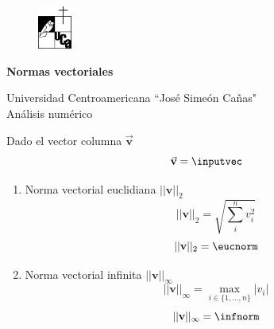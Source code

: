 \documentclass{article}
\newenvironment{fmpage}[1]
{\begin{lrbox}{\fmbox}\begin{minipage}{#1}}
{\end{minipage}\end{lrbox}\fbox{\usebox{\fmbox}}}
\begin{document}
\begin{center}
\begin{minipage}{\linewidth}
\vspace{-0.5cm}
\begin{fmpage}{\linewidth}
\vspace{0.5cm}
\begin{figure}
\vspace{-1.0cm}

\centering
\includegraphics[width=0.1\textwidth]{logo}
\end{figure}
\LARGE{\textbf {Normas vectoriales}}

\vspace{0.5cm}
\large{Universidad Centroamericana ``Jos\'e Sime\'on Ca\~nas"} \\
\large{An\'alisis num\'erico}
\vspace{0.5cm}
\end{fmpage}
\vspace{1cm}
\end{minipage}
\end{center}


\large{Dado el vector columna $\vec{\mathbf{v}}$}
\[
\vec{\mathbf{v}}=
\inputvec
\]

\begin{enumerate}
\item \large{Norma vectorial euclidiana $||\mathbf{v}||_2$}
\[
||\mathbf{v}||_2 = \sqrt{ \sum_{i}^{n} v_i^2}
\]
\[
||\mathbf{v}||_2 = \eucnorm
\]

\item \large{Norma vectorial infinita $||\mathbf{v}||_{\infty}$}
\[
||\mathbf{v}||_{\infty} = \max_{i \in \{1,\hdots,n\}} |v_i|
\]
\[
||\mathbf{v}||_{\infty} = \infnorm
\]
\end{enumerate}
\end{document}
